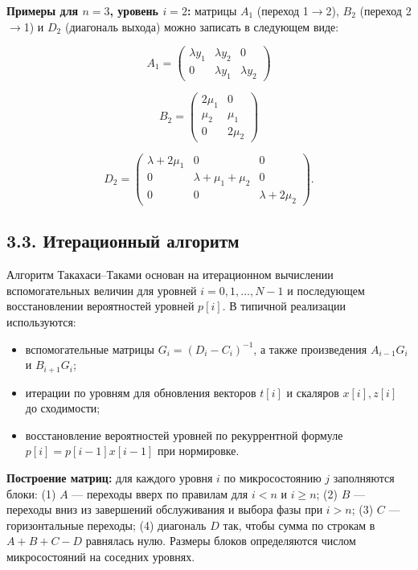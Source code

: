 \textbf{Примеры для \(n=3\), уровень \(i=2\):} матрицы \(A_1\) (переход 1\(\to\)2), \(B_2\) (переход 2\(\to\)1) и \(D_2\) (диагональ выхода) можно записать в следующем виде:




\[A_1=\begin{pmatrix}
\lambda y_1 & \lambda y_2 & 0\\
0 & \lambda y_1 & \lambda y_2
\end{pmatrix}\]





\[B_2=\begin{pmatrix}
2\mu_1 & 0\\
\mu_2 & \mu_1\\
0 & 2\mu_2
\end{pmatrix}\]





\[D_2=\begin{pmatrix}
\lambda+2\mu_1 & 0 & 0\\
0 & \lambda+\mu_1+\mu_2 & 0\\
0 & 0 & \lambda+2\mu_2
\end{pmatrix}.\]





\subsection*{3.3. Итерационный алгоритм}
Алгоритм Такахаси--Таками основан на итерационном вычислении вспомогательных величин для уровней \(i=0,1,\dots,N-1\) и последующем восстановлении вероятностей уровней \(p[i]\). В типичной реализации используются:
\begin{itemize}[leftmargin=1.2em]
  \item вспомогательные матрицы \(G_i=(D_i-C_i)^{-1}\), а также произведения \(A_{i-1}G_i\) и \(B_{i+1}G_i\);
  \item итерации по уровням для обновления векторов \(t[i]\) и скаляров \(x[i],z[i]\) до сходимости;
  \item восстановление вероятностей уровней по рекуррентной формуле \(p[i]=p[i-1]x[i-1]\) при нормировке.
\end{itemize}

\textbf{Построение матриц:} для каждого уровня \(i\) по микросостоянию \(j\) заполняются блоки: (1) \(A\) --- переходы вверх по правилам для \(i<n\) и \(i\ge n\); (2) \(B\) --- переходы вниз из завершений обслуживания и выбора фазы при \(i>n\); (3) \(C\) --- горизонтальные переходы; (4) диагональ \(D\) так, чтобы сумма по строкам в \(A+B+C-D\) равнялась нулю. Размеры блоков определяются числом микросостояний на соседних уровнях.

